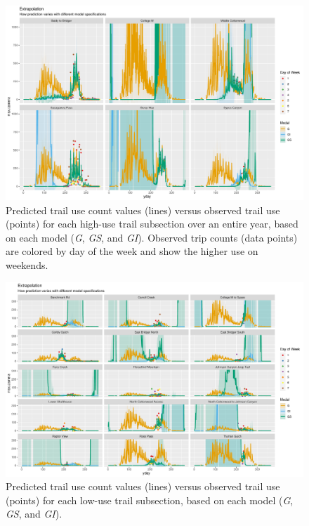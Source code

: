 \documentclass[
]{book}
\begin{document}
\begin{figure}

{\centering \includegraphics[width=1\linewidth]{../figures/high_pred_compare} 

}

\caption{Predicted trail use count values (lines) versus observed trail use (points) for each high-use trail subsection over an entire year, based on each model (\emph{G}, \emph{GS}, and \emph{GI}). Observed trip counts (data points) are colored by day of the week and show the higher use on weekends. }\label{fig:high-compare-pred}
\end{figure}

\begin{figure}

{\centering \includegraphics[width=1\linewidth]{../figures/low_pred_compare} 

}

\caption{Predicted trail use count values (lines) versus observed trail use (points) for each low-use trail subsection, based on each model (\emph{G}, \emph{GS}, and \emph{GI}).}\label{fig:low-compare-pred}
\end{figure}
\end{document}
